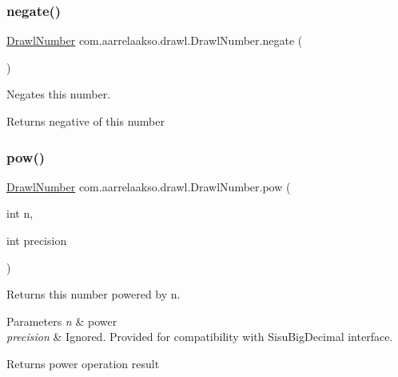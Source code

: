\subsubsection{\texorpdfstring{negate()}{negate()}}
{\footnotesize\ttfamily \hyperlink{classcom_1_1aarrelaakso_1_1drawl_1_1_drawl_number}{Drawl\+Number} com.\+aarrelaakso.\+drawl.\+Drawl\+Number.\+negate (\begin{DoxyParamCaption}{ }\end{DoxyParamCaption})\hspace{0.3cm}{\ttfamily [protected]}}



Negates this number. 

\begin{DoxyReturn}{Returns}
negative of this number 
\end{DoxyReturn}
\mbox{\label{classcom_1_1aarrelaakso_1_1drawl_1_1_drawl_number_aa88990d915ee2e7997180d96bb7b6312}} 
\subsubsection{\texorpdfstring{pow()}{pow()}}
{\footnotesize\ttfamily \hyperlink{classcom_1_1aarrelaakso_1_1drawl_1_1_drawl_number}{Drawl\+Number} com.\+aarrelaakso.\+drawl.\+Drawl\+Number.\+pow (\begin{DoxyParamCaption}\item[{int}]{n,  }\item[{int}]{precision }\end{DoxyParamCaption})\hspace{0.3cm}{\ttfamily [protected]}}



Returns this number powered by n. 


\begin{DoxyParams}{Parameters}
{\em n} & power \\
\hline
{\em precision} & Ignored. Provided for compatibility with Sisu\+Big\+Decimal interface. \\
\hline
\end{DoxyParams}
\begin{DoxyReturn}{Returns}
power operation result 
\end{DoxyReturn}
\mbox{\label{classcom_1_1aarrelaakso_1_1drawl_1_1_drawl_number_a1f95d60be39632cb888dab572894822f}} 
